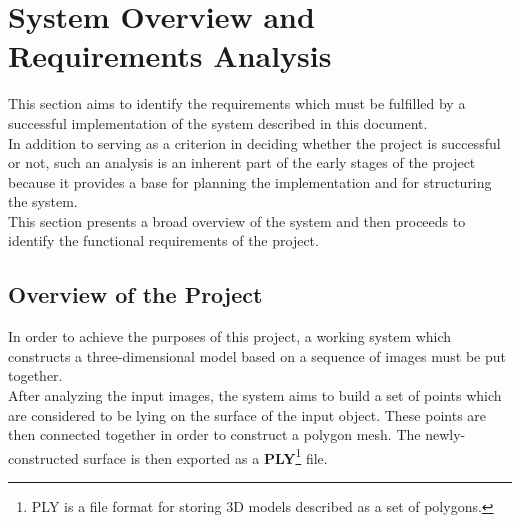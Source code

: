 \documentclass[12pt,a4paper,twoside,openright]{report}
\begin{document}

\section{System Overview and Requirements Analysis}
This section aims to identify the requirements which must be fulfilled by a successful implementation of the system described in this document.\\
In addition to serving as a criterion in deciding whether the project is successful or not, such an analysis is an inherent part of the early stages of the project because it provides a base for planning the implementation and for structuring the system.\\
\linebreak
This section presents a broad overview of the system and then proceeds to identify the functional requirements of the project.
\subsection{Overview of the Project}
In order to achieve the purposes of this project, a working system which constructs a three-dimensional model based on a sequence of images must be put together. \\
After analyzing the input images, the system aims to build a set of points which are considered to be lying on the surface of the input object. These points are then connected together in order to construct a polygon mesh. The newly-constructed surface is then exported as a \textbf{PLY}\footnote{PLY is a file format for storing 3D models described as a set of polygons.} file.\\
\end{document}

